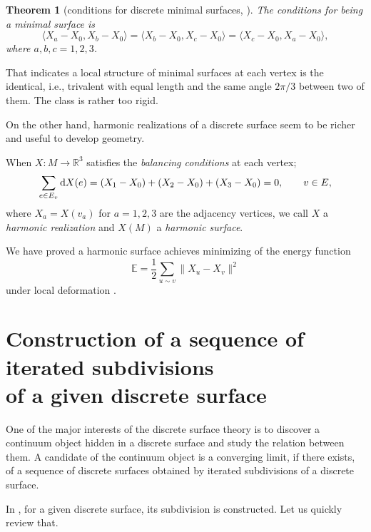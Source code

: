 \documentclass[10pt,a4paper]{amsart}
\newcommand{\R}{\mathbb{R}}
\newcommand{\1}{{\bf 1}}
\newcommand{\nai}{\langle}
\newcommand{\seki}{\rangle}
\numberwithin{equation}{section}
\newtheorem{Theorem}{Theorem}[section]
\begin{document}
\begin{Theorem}[conditions for discrete minimal surfaces, \cite{kotani-naito-omori}]
 The conditions for being a minimal surface is
 \begin{displaymath}
 \nai X_a-X_0, X_b- X_0\seki = \nai X_b-X_0, X_c- X_0\seki= \nai X_c-X_0, X_a- X_0\seki,
 \end{displaymath}
 where $a,b,c =1,2,3$.
\end{Theorem}
That indicates a local structure of minimal surfaces at each vertex is the identical,
i.e., trivalent with equal length and the same angle $2\pi/3$ between two of them.
The class is rather too rigid.

On the other hand, harmonic realizations of a discrete surface seem to be richer and useful to develop geometry.
\begin{Definition}
 When $X\colon M \to \R^3$ satisfies the {\em balancing conditions} at each vertex;
 \begin{equation}
 \label{eq:balancing}
 \sum_{e \in E_v}{\rm d}X(e) = (X_1-X_0) +(X_2-X_0) + (X_3-X_0) =0, \qquad v \in E,
 \end{equation}
 where $X_a = X (v_a)$ for $a=1,2,3$ are the adjacency vertices,
 we call $X$ a {\em harmonic realization} and $X(M)$ a {\em harmonic surface}.
\end{Definition}
We have proved a harmonic surface achieves minimizing of the energy function
\begin{displaymath}
 \mathbb{E} = \frac{1}{2}\sum_{u\sim v} \|X_u-X_v\|^2
\end{displaymath}
under local deformation \cite{kotani-naito-omori}.

\section[Construction of a sequence of iterated subdivisions of a given discrete surface]{Construction of a sequence of iterated subdivisions\\ of a given discrete surface}

One of the major interests of the discrete surface theory is to discover a continuum object hidden
in a discrete surface and study the relation between them.
A candidate of the continuum object is a converging limit,
if there exists, of a sequence of discrete surfaces obtained by iterated subdivisions of a discrete surface.

In \cite{kotani-naito-tao, tao}, for a given discrete surface, its subdivision is constructed.
Let us quickly review that.
\end{document}
